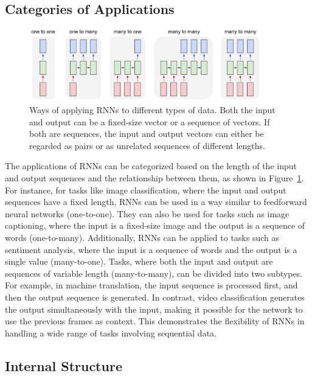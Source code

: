 \documentclass{article}
\newcommand{\reffig}[1]{Figure~\ref{#1}}
\begin{document}
\subsection{Categories of Applications}
\label{sec:2.0}

\begin{figure}[htbp]
  \centering
  \includegraphics[width=0.9\textwidth]{Karpathy application types.jpeg}
  \caption{Ways of applying RNNs to different types of data. Both the input and output can
    be a fixed-size vector or a sequence of vectors. If both are sequences, the input and
    output vectors can either be regarded as pairs or as unrelated sequences of different
    lengths. \cite{karpathyUnreasonableEffectivenessRecurrent}}
  \label{fig:rnn-application-types}
\end{figure}

The applications of RNNs can be categorized based on the length of the input and output
sequences and the relationship between them, as shown in
\reffig{fig:rnn-application-types}. For instance, for tasks like image classification,
where the input and output sequences have a fixed length, RNNs can be used in a way
similar to feedforward neural networks (one-to-one). They can also be used for tasks such
as image captioning, where the input is a fixed-size image and the output is a sequence of
words (one-to-many). Additionally, RNNs can be applied to tasks such as sentiment
analysis, where the input is a sequence of words and the output is a single value
(many-to-one). Tasks, where both the input and output are sequences of variable length
(many-to-many), can be divided into two subtypes. For example, in machine translation, the
input sequence is processed first, and then the output sequence is generated. In contrast,
video classification generates the output simultaneously with the input, making it
possible for the network to use the previous frames as context. This demonstrates the
flexibility of RNNs in handling a wide range of tasks involving sequential data.


\subsection{Internal Structure}
\label{sec:2.1}
\end{document}
